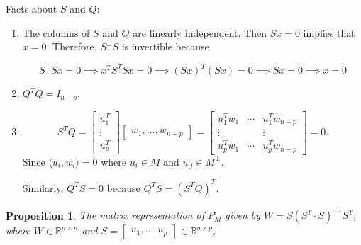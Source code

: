 \documentclass[12pt]{article}
\newtheorem*{proposition}{Proposition}
\theoremstyle{definition}
\begin{document}
\noindent Facts about $S$ and $Q$:
\begin{enumerate}[label = (\arabic*)]
\item The columns of $S$ and $Q$ are linearly independent. Then $Sx = 0$ implies that
$x = 0$. Therefore, $S^{\perp} S$ is invertible because

\[S^{\perp} Sx = 0 \implies x^T S^T S x = 0 \implies (Sx)^T (Sx) = 0 \implies Sx = 
0 \implies x = 0 \]

\item $Q^T Q = I_{n - p}$.

\item 
\[S^T Q = 
\begin{bmatrix}
u_1^{T} \\
\vdots \\
u_p^{T}
\end{bmatrix}
\begin{bmatrix}
w_1, \ldots, w_{n - p}
\end{bmatrix}
=
\begin{bmatrix}
u_1^T w_1 & \cdots & u_1^T w_{n - p} \\
\vdots & & \vdots \\
u_p^T w_1 & \cdots & u_p^T w_{n - p}
\end{bmatrix}
=
0.
\]
Since $\langle u_i, w_i \rangle = 0$ where $u_i \in M$ and $w_j \in M^{\perp}$.

Similarly, $Q^T S = 0$ because $Q^T S = (S^T Q )^T$.
\end{enumerate}


\begin{proposition}
The matrix representation of $P_M$ given by $W = S(S^T \cdot S)^{-1} S^T$, where 
$W \in \mathbb{R}^{n \times n}$ and
$S = \begin{bmatrix} u_1, \ldots, u_p \end{bmatrix} \in \mathbb{R}^{n \times p}$,
\end{proposition}
\end{document}
